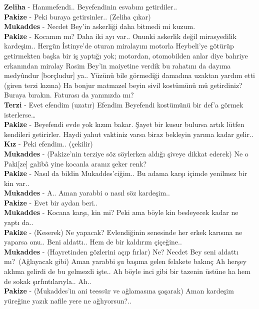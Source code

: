 \documentclass[]{book}
\begin{document}
\textbf{Zeliha} - Hanımefendi.. Beyefendinin esvabını getirdiler..\\
\textbf{Pakize} - Peki buraya getirsinler.. (Zeliha çıkar)\\
\textbf{Mukaddes} - Necdet Bey'in askerliği daha bitmedi mi kuzum.\\
\textbf{Pakize} - Kocamın mı? Daha iki ayı var.. Onunki askerlik değil mirasyedilik kardeşim.. Hergün İstinye'de oturan miralayını motorla Heybeli'ye götürüp getirmekten başka bir iş yaptığı yok; motordan, otomobilden anlar diye bahriye erkanından miralay Rasim Bey'in maiyetine verdik bu rahatını da dayıma medyûndur {[}borçludur{]} ya.. Yüzünü bile görmediği damadına uzaktan yardım etti (giren terzi kızına) Ha bonjur matmazel beyin sivil kostümünü mü getirdiniz? Buraya bırakın. Faturası da yanınızda mı?\\
\textbf{Terzi} - Evet efendim (uzatır) Efendim Beyefendi kostümünü bir def'a görmek isterlerse\ldots{}\\
\textbf{Pakize} - Beyefendi evde yok kızım bakar. Şayet bir kusur bulursa artık lütfen kendileri getirirler. Haydi yahut vaktiniz varsa biraz bekleyin yarıma kadar gelir..\\
\textbf{Kız} - Peki efendim.. (çekilir)\\
\textbf{Mukaddes} - (Pakize'nin terziye söz söylerken aldığı şiveye dikkat ederek) Ne o Paki{[}ze{]} galibâ yine kocanla aranız şeker renk?\\
\textbf{Pakize} - Nasıl da bildin Mukaddes'ciğim.. Bu adama karşı içimde yenilmez bir kin var..\\
\textbf{Mukaddes} - A.. Aman yarabbi o nasıl söz kardeşim..\\
\textbf{Pakize} - Evet bir aydan beri..\\
\textbf{Mukaddes} - Kocana karşı, kin mi? Peki ama böyle kin besleyecek kadar ne yaptı da..\\
\textbf{Pakize} - (Keserek) Ne yapacak? Evlendiğinin senesinde her erkek karısına ne yaparsa onu.. Beni aldattı.. Hem de bir kaldırım çiçeğine..\\
\textbf{Mukaddes} - (Hayretinden gözlerini açıp fırlar) Ne? Necdet Bey seni aldattı mı?~(Ağlayacak gibi) Aman yarabbi şu başıma gelen felakete bakınç Ah herşey aklıma gelirdi de bu gelmezdi işte.. Ah böyle inci gibi bir tazenin üstüne ha hem de sokak şırfıntılarıyla.. Ah..\\
\textbf{Pakize} - (Mukaddes'in ani teessür ve ağlamasına şaşarak) Aman kardeşim yüreğine yazık nafile yere ne ağlıyorsun?..\\
\end{document}

